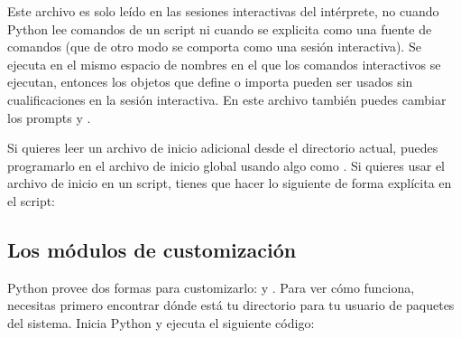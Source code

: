\documentclass[a4,10pt,spanish]{sphinxmanual}
\begin{document}
\sphinxAtStartPar
Este archivo es solo leído en las sesiones interactivas del intérprete, no cuando Python lee comandos de un script ni cuando  se explicita como una fuente de comandos (que de otro modo se comporta como una sesión interactiva).  Se ejecuta en el mismo espacio de nombres en el que los comandos interactivos se ejecutan, entonces los objetos que define o importa pueden ser usados sin cualificaciones en la sesión interactiva.  En este archivo también puedes cambiar los prompts  y .

\sphinxAtStartPar
Si quieres leer un archivo de inicio adicional desde el directorio actual, puedes programarlo en el archivo de inicio global usando algo como .  Si quieres usar el archivo de inicio en un script, tienes que hacer lo siguiente de forma explícita en el script:

\begin{sphinxVerbatim}[commandchars=\\\{\}]
 
  
   
       
          
\end{sphinxVerbatim}


\subsection{Los módulos de customización}
\label{\detokenize{tutorial/appendix:the-customization-modules}}\label{\detokenize{tutorial/appendix:tut-customize}}
\sphinxAtStartPar
Python provee dos formas para customizarlo:  y .  Para ver cómo funciona, necesitas primero encontrar dónde está tu directorio para tu usuario de paquetes del sistema.  Inicia Python y ejecuta el siguiente código:
\end{document}
